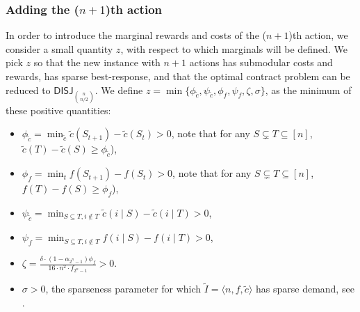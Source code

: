 \documentclass[11pt]{article}
\newcommand{\inst}[3]{\langle #1, #2, #3 \rangle}
\newcommand{\DISJ}[1]{\mathsf{DISJ}_{#1}}
\newcommand{\tc}{\tilde{c}}
\newcommand{\tI}{\tilde{I}}
\newcommand{\InstTildeI}{\tI = \inst{n}{f}{\tc}}
\begin{document}
\subsubsection{Adding the ($n+1$)th action}
In order to introduce the marginal rewards and costs of the ($n+1$)th action, we consider a small quantity $z$, with respect to which marginals will be defined.
We pick $z$ so that the new instance with $n+1$ actions has submodular costs and rewards, has sparse best-response, and that the optimal contract problem can be reduced to $\DISJ{\binom{n}{n/2}}$.
We define $z = \min \{\phi_{\tc},\psi_{\tc},\phi_f,\psi_f, \zeta, \sigma\}$, as the minimum of these positive quantities:
\begin{itemize}
    \setlength\itemsep{-0.25em}
    \item $\phi_{\tc} = \min_{\tc} \tc(S_{t+1})-\tc(S_{t}) > 0$, note that for any $S \subsetneq T \subseteq [n]$, $\tc(T)-\tc(S) \ge \phi_{\tc}$),
    \item $\phi_f = \min_{t} f(S_{t+1})-f(S_{t}) > 0$, note that for any $S \subsetneq T \subseteq [n]$, $f(T)-f(S) \ge \phi_{f}$),
    \item $\psi_{\tc} = \min_{S\subseteq T, i \notin T} \tc(i \mid S)-\tc(i \mid T) > 0$,
    \item $\psi_f = \min_{S\subseteq T, i \notin T} f(i \mid S)-f(i \mid T) > 0$,
    \item $\zeta = \frac{\delta \cdot (1-\alpha_{2^n-1}) \phi_f}{16\cdot n^2 \cdot f_{2^n-1}}> 0$.
    \item $\sigma>0$, the sparseness parameter for which $\InstTildeI$ has sparse demand, see .
\end{itemize}
\end{document}
